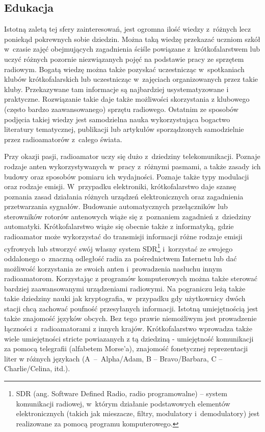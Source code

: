 \documentclass[]{mgr}
\begin{document}
            \subsection{Edukacja}
            Istotną zaletą tej sfery zainteresowań, jest ogromna ilość wiedzy z~różnych lecz poniekąd pokrewnych sobie dziedzin. Można taką wiedzę przekazać uczniom szkół w~czasie zajęć obejmujących zagadnienia ściśle powiązane z~krótkofalarstwem lub uczyć różnych pozornie niezwiązanych pojęć na podstawie pracy ze sprzętem radiowym. Bogatą wiedzę można także pozyskać uczestnicząc w~spotkaniach klubów krótkofalarskich lub uczestnicząc w~zajęciach organizowanych przez takie kluby. Przekazywane tam informacje są najbardziej usystematyzowane i praktyczne. Rozwiązanie takie daje także możliwości skorzystania z klubowego (często bardzo zaawansowanego) sprzętu radiowego. Ostatnim ze sposobów podjęcia takiej wiedzy jest samodzielna nauka wykorzystująca bogactwo literatury tematycznej, publikacji lub artykułów sporządzonych samodzielnie przez radioamatorów z~całego świata.

            Przy okazji pasji, radioamator uczy się dużo z~dziedziny telekomunikacji. Poznaje rodzaje anten wykorzystywanych w~pracy z~różnymi pasmami, a także zasady ich budowy oraz sposobów pomiaru ich wydajności. Poznaje także typy modulacji oraz rodzaje emisji. W~przypadku elektroniki, krótkofalarstwo daje szansę poznania zasad działania różnych urządzeń elektronicznych oraz zagadnienia przetwarzania sygnałów. Budowanie automatycznych przełączników lub sterowników rotorów antenowych wiąże się z~poznaniem zagadnień z~dziedziny automatyki. Krótkofalarstwo wiąże się obecnie także z informatyką, gdzie radioamator może wykorzystać do transmisji informacji różne rodzaje emisji cyfrowych lub stworzyć swój własny system SDR\footnote{SDR (ang. Software Defined Radio, radio programowalne) – system komunikacji radiowej, w~którym działanie podstawowych elementów elektronicznych (takich jak mieszacze, filtry, modulatory i~demodulatory) jest realizowane za pomocą programu komputerowego.} i~korzystać ze swojego oddalonego o~znaczną odległość radia za pośrednictwem Internetu lub dać możliwość korzystania ze swoich anten i~prowadzenia nasłuchu innym radioamatorom. Korzystając z programów komputerowych można także sterować bardziej zaawansowanymi urządzeniami radiowymi. Na pograniczu leżą także takie dziedziny nauki jak kryptografia, w~przypadku gdy użytkownicy dwóch stacji chcą zachować poufność przesyłanych informacji. Istotną umiejętnością jest także znajomość języków obcych. Bez tego prawie niemożliwym jest prowadzenie łączności z~radioamatorami z innych krajów. Krótkofalarstwo wprowadza także wiele umiejętności stricte powiazanych z tą dziedziną - umiejętność komunikacji za pomocą telegrafii (alfabetem Morse'a), znajomość fonetycznej reprezentacji liter w różnych językach (\mbox{A -- Alpha/Adam}, B -- Bravo/Barbara, C -- Charlie/Celina, itd.).
\end{document}
